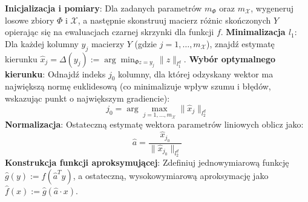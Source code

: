 \begin{algorithm}
\caption{Algorytm aproksymacji dla $k = 1$}\label{alg:jednowymiarowy}
\begin{algorithmic}
    \State \textbf{Inicjalizacja i pomiary}: Dla zadanych parametrów $m_\Phi$ oraz $m_\mathcal{X}$, wygeneruj losowe zbiory $\Phi$ i $\mathcal{X}$, a następnie skonstruuj macierz różnic skończonych $Y$ opierając się na ewaluacjach czarnej skrzynki dla funkcji $f$.
    \State \textbf{Minimalizacja $l_1$}: Dla każdej kolumny $y_j$ macierzy $Y$ (gdzie $j = 1, \dots, m_\mathcal{X}$), znajdź estymatę kierunku $\hat{x}_j = \Delta(y_j) := \arg\min_{\Phi z = y_j} \|z\|_{l_1^d}$.
    \State \textbf{Wybór optymalnego kierunku}: Odnajdź indeks $j_0$ kolumny, dla której odzyskany wektor ma największą normę euklidesową (co minimalizuje wpływ szumu i błędów, wskazując punkt o największym gradiencie):
        $$j_0 = \arg\max_{j=1,\dots,m_\mathcal{X}} \|\hat{x}_j\|_{l_2^d}$$
    \State \textbf{Normalizacja}: Ostateczną estymatę wektora parametrów liniowych oblicz jako:
        $$\hat{a} = \frac{\hat{x}_{j_0}}{\|\hat{x}_{j_0}\|_{l_2^d}}$$
    \State \textbf{Konstrukcja funkcji aproksymującej}: Zdefiniuj jednowymiarową funkcję $\hat{g}(y) := f(\hat{a}^T y)$, a ostateczną, wysokowymiarową aproksymację jako $\hat{f}(x) := \hat{g}(\hat{a} \cdot x)$.
\end{algorithmic}
\end{algorithm}


